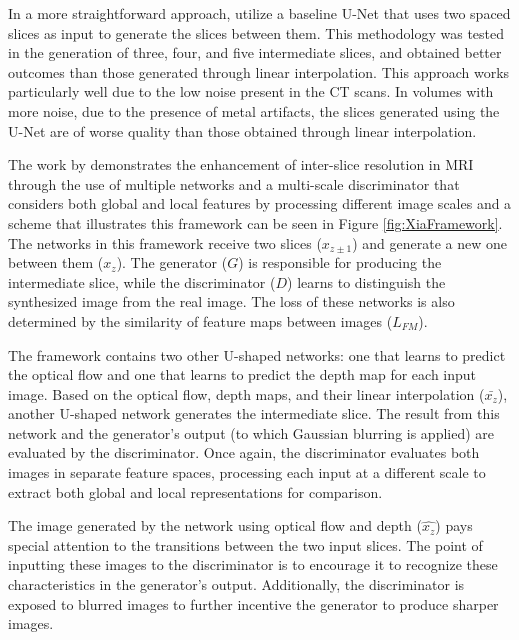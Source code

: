 In a more straightforward approach, \textcite{Nishimoto2024} utilize a baseline U-Net that uses two spaced slices as input to generate the slices between them. This methodology was tested in the generation of three, four, and five intermediate slices, and obtained better outcomes than those generated through linear interpolation. This approach works particularly well due to the low noise present in the CT scans. In volumes with more noise, due to the presence of metal artifacts, the slices generated using the U-Net are of worse quality than those obtained through linear interpolation.
\par
The work by \textcite{Xia2021} demonstrates the enhancement of inter-slice resolution in MRI through the use of multiple networks and a multi-scale discriminator that considers both global and local features by processing different image scales and a scheme that illustrates this framework can be seen in Figure \ref{fig:XiaFramework}. The networks in this framework receive two slices ($x_{z\pm1}$) and generate a new one between them ($x_{z}$). The generator ($G$) is responsible for producing the intermediate slice, while the discriminator ($D$) learns to distinguish the synthesized image from the real image. The loss of these networks is also determined by the similarity of feature maps between images ($L_{FM}$).
\par
The framework contains two other U-shaped networks: one that learns to predict the optical flow and one that learns to predict the depth map for each input image. Based on the optical flow, depth maps, and their linear interpolation ($\bar{x_{z}}$), another U-shaped network generates the intermediate slice. The result from this network and the generator's output (to which Gaussian blurring is applied) are evaluated by the discriminator. Once again, the discriminator evaluates both images in separate feature spaces, processing each input at a different scale to extract both global and local representations for comparison.
\par
The image generated by the network using optical flow and depth ($\hat{x_{z}}$) pays special attention to the transitions between the two input slices. The point of inputting these images to the discriminator is to encourage it to recognize these characteristics in the generator's output. Additionally, the discriminator is exposed to blurred images to further incentive the generator to produce sharper images.


